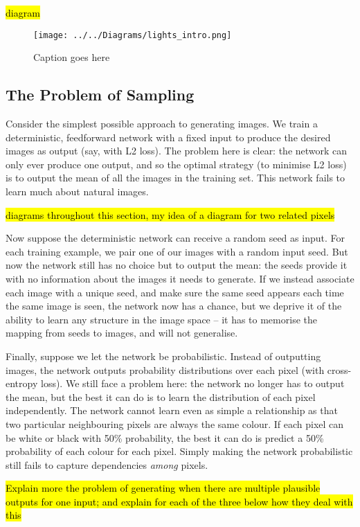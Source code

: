 \documentclass[10pt,a4paper]{article}
\begin{document}
\hl{diagram}

\begin{figure}
  \texttt{[image: ../../Diagrams/lights\_intro.png]}
  \caption{Caption goes here}
  \label{marker}
\end{figure}


\subsection{The Problem of Sampling}

Consider the simplest possible approach to generating images. We train a deterministic, feedforward network with a fixed input to produce the desired images as output (say, with L2 loss). The problem here is clear: the network can only ever produce one output, and so the optimal strategy (to minimise L2 loss) is to output the mean of all the images in the training set. This network fails to learn much about natural images.

\hl{diagrams throughout this section, my idea of a diagram for two related pixels}

Now suppose the deterministic network can receive a random seed as input. For each training example, we pair one of our images with a random input seed. But now the network still has no choice but to output the mean: the seeds provide it with no information about the images it needs to generate. If we instead associate each image with a unique seed, and make sure the same seed appears each time the same image is seen, the network now has a chance, but we deprive it of the ability to learn any structure in the image space -- it has to memorise the mapping from seeds to images, and will not generalise.

Finally, suppose we let the network be probabilistic. Instead of outputting images, the network outputs probability distributions over each pixel (with cross-entropy loss). We still face a problem here: the network no longer has to output the mean, but the best it can do is to learn the distribution of each pixel independently. The network cannot learn even as simple a relationship as that two particular neighbouring pixels are always the same colour. If each pixel can be white or black with 50\% probability, the best it can do is predict a 50\% probability of each colour for each pixel. Simply making the network probabilistic still fails to capture dependencies \emph{among} pixels.

\hl{Explain more the problem of generating when there are multiple plausible outputs for one input; and explain for each of the three below how they deal with this}
\end{document}
